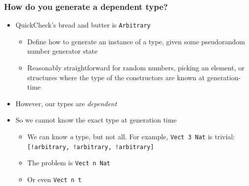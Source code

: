 \documentclass[compress,handout]{beamer}
\begin{document}
\begin{frame}
  \frametitle{How do you generate a dependent type?}

  \begin{itemize}
    \item<1-> QuickCheck's bread and butter is \texttt{Arbitrary}
    \begin{itemize}
      \item<2-> Define how to generate an instance of a type, given some
            pseudorandom number generator state
      \item<3-> Reasonably straightforward for random numbers, picking an
                element, or structures where the type of the constructors are
                known at generation-time
    \end{itemize}
    \item<4-> However, our types are \textit{dependent}
    \item<5-> So we cannot know the exact type at generation time
    \begin{itemize}
      \item<6-> We can know \textit{a} type, but not all. For example,
                \texttt{Vect 3 Nat} is trivial:
                \texttt{[!arbitrary, !arbitrary, !arbitrary]}
      \item<7-> The problem is\hspace*{2mm} \texttt{Vect n Nat}
      \item<8-> Or even\hspace*{2mm} \texttt{Vect n t}
    \end{itemize}
  \end{itemize}

\end{frame}
\end{document}
